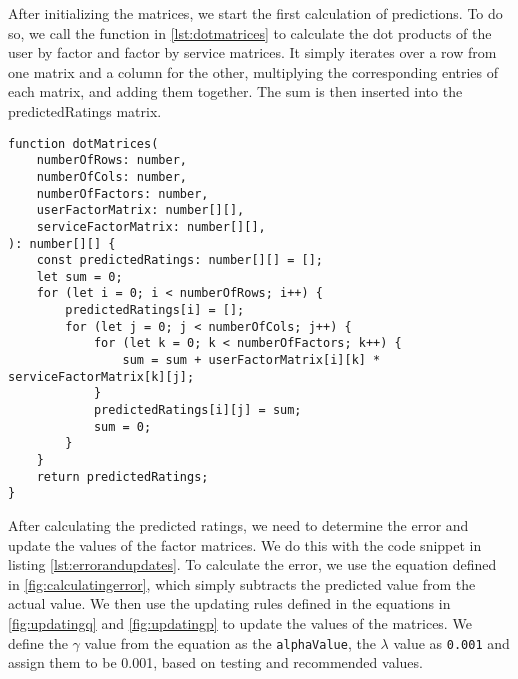 After initializing the matrices, we start the first calculation of predictions.
To do so, we call the function in \autoref{lst:dotmatrices} to calculate the dot products of the user by factor and factor by service matrices.
It simply iterates over a row from one matrix and a column for the other, multiplying the corresponding entries of each matrix, and adding them together.
The sum is then inserted into the predictedRatings matrix.
\begin{lstlisting}[caption={Calculating the dot predict of a matrix}, captionpos=b, label={lst:dotmatrices}]
function dotMatrices(
    numberOfRows: number,
    numberOfCols: number,
    numberOfFactors: number,
    userFactorMatrix: number[][],
    serviceFactorMatrix: number[][],
): number[][] {
    const predictedRatings: number[][] = [];
    let sum = 0;
    for (let i = 0; i < numberOfRows; i++) {
        predictedRatings[i] = [];
        for (let j = 0; j < numberOfCols; j++) {
            for (let k = 0; k < numberOfFactors; k++) {
                sum = sum + userFactorMatrix[i][k] * serviceFactorMatrix[k][j];
            }
            predictedRatings[i][j] = sum;
            sum = 0;
        }
    } 
    return predictedRatings;
}
\end{lstlisting}
After calculating the predicted ratings, we need to determine the error and update the values of the factor matrices.
We do this with the code snippet in listing \autoref{lst:errorandupdates}.
To calculate the error, we use the equation defined in \autoref{fig:calculatingerror}, which simply subtracts the predicted value from the actual value.
We then use the updating rules defined in the equations in \autoref{fig:updatingq} and \autoref{fig:updatingp} to update the values of the matrices.
We define the $\gamma$ value from the equation as the \texttt{alphaValue}, the $\lambda$ value as \texttt{0.001} and assign them to be 0.001, based on testing and recommended values.

